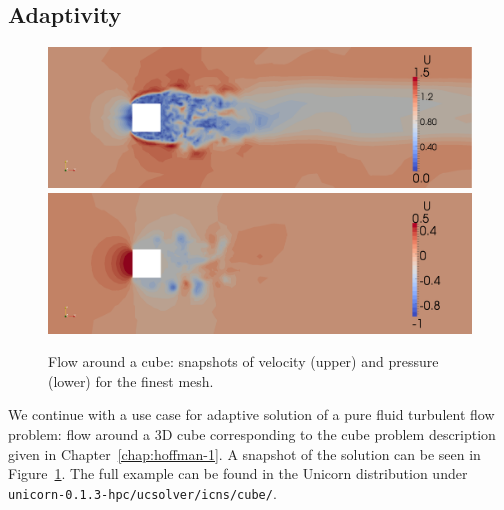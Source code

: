 \subsection{Adaptivity}

\begin{figure}
  \centering
  \includegraphics[width=\largefig]{chapters/hoffman-1/png/fig2b.png}
  \medskip
  \includegraphics[width=\largefig]{chapters/hoffman-1/png/fig2c.png}
  \caption{Flow around a cube: snapshots of velocity (upper) and pressure
    (lower) for the finest mesh.}
  \label{fig:cube2}
\end{figure}

We continue with a use case for adaptive solution of a pure fluid
turbulent flow problem: flow around a 3D cube corresponding to the
cube problem description given in Chapter~\ref{chap:hoffman-1}. A
snapshot of the solution can be seen in Figure~\ref{fig:cube2}. The
full example can be found in the Unicorn distribution under {\tt
unicorn-0.1.3-hpc/ucsolver/icns/cube/}.


